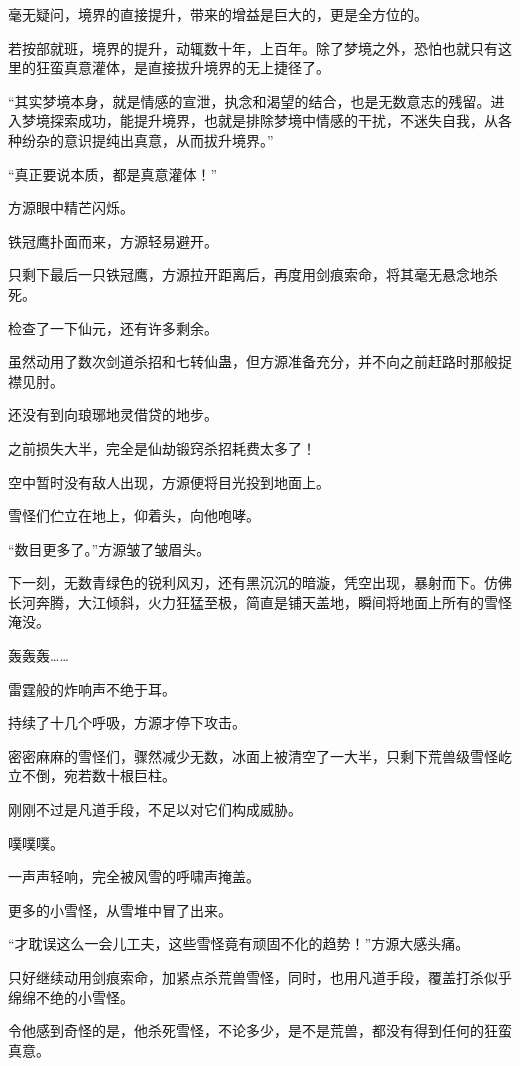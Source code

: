 \begin{this_body}
毫无疑问，境界的直接提升，带来的增益是巨大的，更是全方位的。

若按部就班，境界的提升，动辄数十年，上百年。除了梦境之外，恐怕也就只有这里的狂蛮真意灌体，是直接拔升境界的无上捷径了。

“其实梦境本身，就是情感的宣泄，执念和渴望的结合，也是无数意志的残留。进入梦境探索成功，能提升境界，也就是排除梦境中情感的干扰，不迷失自我，从各种纷杂的意识提纯出真意，从而拔升境界。”

“真正要说本质，都是真意灌体！”

方源眼中精芒闪烁。

铁冠鹰扑面而来，方源轻易避开。

只剩下最后一只铁冠鹰，方源拉开距离后，再度用剑痕索命，将其毫无悬念地杀死。

检查了一下仙元，还有许多剩余。

虽然动用了数次剑道杀招和七转仙蛊，但方源准备充分，并不向之前赶路时那般捉襟见肘。

还没有到向琅琊地灵借贷的地步。

之前损失大半，完全是仙劫锻窍杀招耗费太多了！

空中暂时没有敌人出现，方源便将目光投到地面上。

雪怪们伫立在地上，仰着头，向他咆哮。

“数目更多了。”方源皱了皱眉头。

下一刻，无数青绿色的锐利风刃，还有黑沉沉的暗漩，凭空出现，暴射而下。仿佛长河奔腾，大江倾斜，火力狂猛至极，简直是铺天盖地，瞬间将地面上所有的雪怪淹没。

轰轰轰……

雷霆般的炸响声不绝于耳。

持续了十几个呼吸，方源才停下攻击。

密密麻麻的雪怪们，骤然减少无数，冰面上被清空了一大半，只剩下荒兽级雪怪屹立不倒，宛若数十根巨柱。

刚刚不过是凡道手段，不足以对它们构成威胁。

噗噗噗。

一声声轻响，完全被风雪的呼啸声掩盖。

更多的小雪怪，从雪堆中冒了出来。

“才耽误这么一会儿工夫，这些雪怪竟有顽固不化的趋势！”方源大感头痛。

只好继续动用剑痕索命，加紧点杀荒兽雪怪，同时，也用凡道手段，覆盖打杀似乎绵绵不绝的小雪怪。

令他感到奇怪的是，他杀死雪怪，不论多少，是不是荒兽，都没有得到任何的狂蛮真意。


\end{this_body}
